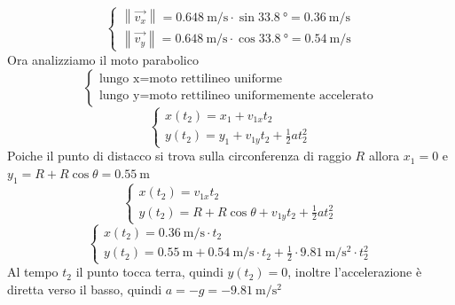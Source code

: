 \documentclass{article}
\newcommand{\norm}[1]{\left\lVert#1\right\rVert}
\begin{document}
\begin{enumerate}[label=\alph*)]
\begin{equation*}
\begin{cases}
                  \norm{\vec{v_x}} = \SI{0.648}{\meter\per\second} \cdot \sin \SI{33.8}{\degree} = \SI{0.36}{\meter\per\second} \\
                  \norm{\vec{v_y}} = \SI{0.648}{\meter\per\second} \cdot \cos \SI{33.8}{\degree} = \SI{0.54}{\meter\per\second}
              \end{cases}
          \end{equation*}
          Ora analizziamo il moto parabolico
          \begin{equation*}
              \begin{cases}
                  \text{lungo x} = \text{moto rettilineo uniforme} \\
                  \text{lungo y} = \text{moto rettilineo uniformemente accelerato}
              \end{cases}
          \end{equation*}
          \begin{equation*}
              \begin{cases}
                  x(t_2) = x_1 + v_{1x} t_2 \\
                  y(t_2) = y_1 + v_{1y} t_2 + \frac{1}{2}  a  t_{2}^2
              \end{cases}
          \end{equation*}
          Poiche il punto di distacco si trova sulla circonferenza di raggio $R$ allora $x_1 = 0$ e $y_1 = R + R \cos \theta = \SI{0,55}{\meter} $
          \begin{equation*}
              \begin{cases}
                  x(t_2) = v_{1x} t_2 \\
                  y(t_2) = R + R \cos \theta + v_{1y} t_2 + \frac{1}{2}  a  t_{2}^2
              \end{cases}
          \end{equation*}
          \begin{equation*}
              \begin{cases}
                  x(t_2) = \SI{0.36}{\meter\per\second} \cdot t_2 \\
                  y(t_2) = \SI{0.55}{\meter} + \SI{0.54}{\meter\per\second} \cdot t_2 + \frac{1}{2} \cdot \SI{9.81}{\meter\per\second\squared} \cdot t_{2}^2
              \end{cases}
          \end{equation*}
          Al tempo $t_2$ il punto tocca terra, quindi $y(t_2) = 0$, inoltre l'accelerazione è diretta verso il basso, quindi $a = -g = -\SI{9.81}{\meter\per\second\squared}$

\end{enumerate}
\end{document}
